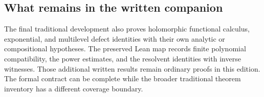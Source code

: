 \subsection{What remains in the written companion}

The final traditional development also proves holomorphic functional calculus, exponential, and multilevel defect identities with their own analytic or compositional hypotheses. The preserved Lean map records finite polynomial compatibility, the power estimates, and the resolvent identities with inverse witnesses. Those additional written results remain ordinary proofs in this edition. The formal contract can be complete while the broader traditional theorem inventory has a different coverage boundary.
